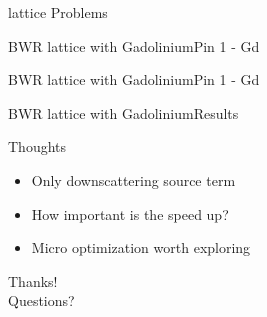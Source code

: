 \documentclass[sans,mathserif,aspectratio=169]{beamer}
\begin{document}
\begin{frame}{lattice Problems}
  \centering
\end{frame}

\begin{frame}{BWR lattice with Gadolinium}{Pin 1 - Gd}
  \centering
\end{frame}

\begin{frame}{BWR lattice with Gadolinium}{Pin 1 - Gd}
  \centering
\end{frame}

\begin{frame}{BWR lattice with Gadolinium}{Results}
  \centering
\end{frame}

\begin{frame}{Thoughts}{}
\begin{itemize}[<+->]
	\item Only downscattering source term
	\item How important is the speed up?
	\item Micro optimization worth exploring
\end{itemize}
\end{frame}

\begin{frame}
\centering
\Huge
Thanks! \\
Questions?
\end{frame}
\end{document}
